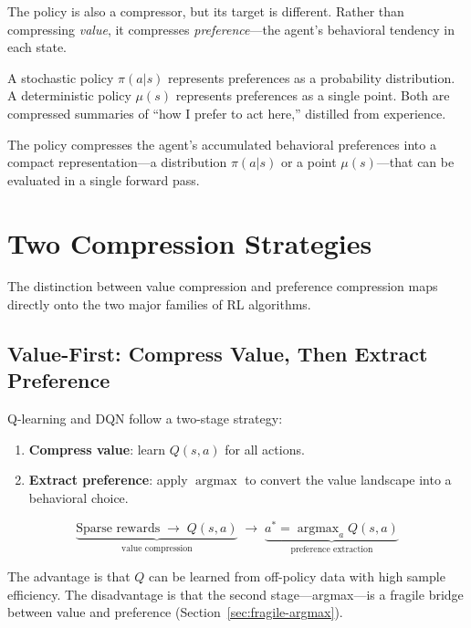 The policy is also a compressor, but its target is different.  Rather than
compressing \emph{value}, it compresses \emph{preference}---the agent's
behavioral tendency in each state.

A stochastic policy $\pi(a|s)$ represents preferences as a probability
distribution.  A deterministic policy $\mu(s)$ represents preferences as a
single point.  Both are compressed summaries of ``how I prefer to act here,''
distilled from experience.

\begin{keyidea}
The policy compresses the agent's accumulated behavioral preferences into a
compact representation---a distribution $\pi(a|s)$ or a point $\mu(s)$---that
can be evaluated in a single forward pass.
\end{keyidea}


\section{Two Compression Strategies}
\label{sec:two-strategies}

The distinction between value compression and preference compression maps
directly onto the two major families of RL algorithms.

\subsection{Value-First: Compress Value, Then Extract Preference}

Q-learning and DQN follow a two-stage strategy:
\begin{enumerate}[nosep]
  \item \textbf{Compress value}: learn $Q(s,a)$ for all actions.
  \item \textbf{Extract preference}: apply $\operatorname{argmax}$ to convert
    the value landscape into a behavioral choice.
\end{enumerate}

\begin{equation}
  \underbrace{\text{Sparse rewards} \;\longrightarrow\; Q(s,a)}_{\text{value compression}}
  \;\longrightarrow\;
  \underbrace{a^{\ast} = \operatorname{argmax}_a Q(s,a)}_{\text{preference extraction}}
\end{equation}

The advantage is that $Q$ can be learned from off-policy data with high sample
efficiency.  The disadvantage is that the second stage---argmax---is a fragile
bridge between value and preference (Section~\ref{sec:fragile-argmax}).

